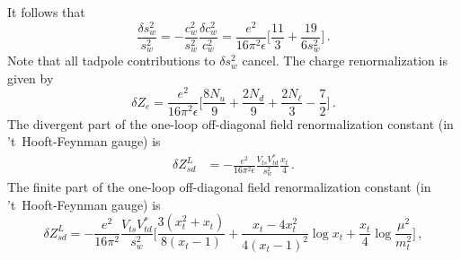 \documentclass[letter,11pt,DIV=12,abstract=true,numbers=noenddot,titlepage=false,twocolumn=false,draft=false]{scrartcl}
\newcommand{\xt}{x_{t}}
\newcommand{\mt}{m_t}
\begin{document}
It follows that
\begin{equation}
\frac{\delta s_{w}^2}{s_w^2}
   = - \frac{c_w^2}{s_w^2} \frac{\delta c_w^2}{c_w^2}
   = \frac{e^2}{16\pi^2\epsilon} 
     \bigg[ \frac{11}{3} + \frac{19}{6s_w^2} \bigg]\,.
\end{equation}
Note that all tadpole contributions to $\delta s_{w}^2$ cancel. The
charge renormalization is given by
\begin{equation}
  \delta Z_{e} = \frac{e^2}{16\pi^2\epsilon}
               \bigg[ \frac{8N_u}{9} + \frac{2N_d}{9} + \frac{2N_\ell}{3} - \frac{7}{2} \bigg] \,.
\end{equation}
The divergent part of the one-loop off-diagonal field renormalization
constant (in 't~Hooft-Feynman gauge) is
\begin{align}\label{eq:Zsd:inf}
  \delta Z_{sd}^L & = - \frac{e^2}{16\pi^2\epsilon}
                     \frac{V_{ts} V_{td}^*}{s_w^2}
                     \frac{\xt}{4} \,.
\end{align}
The finite part of the one-loop off-diagonal field renormalization
constant (in 't~Hooft-Feynman gauge) is
\begin{equation}\label{eq:Zsd:fin}
  \delta Z_{sd}^L = - \frac{e^2}{16\pi^2} \frac{V_{ts} V_{td}^*}{s_w^2}
                   \bigg[   \frac{3(\xt^2 + \xt)}{8(\xt - 1)}
                          + \frac{\xt - 4\xt^2}{4(\xt - 1)^2} \log \xt
                          + \frac{\xt}{4} \log \frac{\mu^2}{\mt^2}
                   \bigg] \,,
\end{equation}
\end{document}

